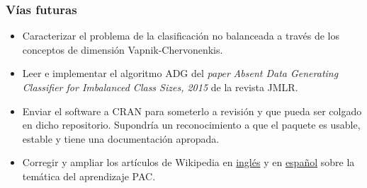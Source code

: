 \begin{frame}\frametitle{Vías futuras}
\fontsize{10pt}{0}\selectfont
 \begin{itemize}
  \item Caracterizar el problema de la clasificación no balanceada a través de los conceptos de dimensión Vapnik-Chervonenkis.
  
  \item Leer e implementar el algoritmo ADG del \textit{paper} \textit{Absent Data Generating Classifier for Imbalanced Class Sizes, 2015}
  de la revista JMLR.
  
  \item Enviar el software a CRAN para someterlo a revisión y que pueda ser colgado en dicho repositorio. 
   Supondría un reconocimiento a que el paquete es usable, estable y tiene una documentación apropada.
   
  \item Corregir y ampliar los artículos de Wikipedia en \href{https://en.wikipedia.org/wiki/Probably_approximately_correct_learning}{inglés}
  y en \href{https://es.wikipedia.org/wiki/Aprendizaje_PAC}{español} sobre la temática del aprendizaje PAC.
 \end{itemize}
\end{frame}